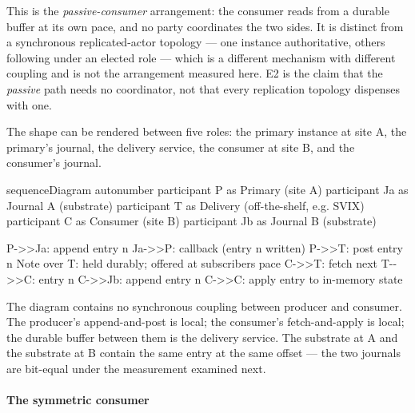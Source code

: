 \documentclass[
]{article}
\newenvironment{Shaded}{}{}
\newcommand{\NormalTok}[1]{#1}
\begin{document}
This is the \emph{passive-consumer} arrangement: the consumer reads from
a durable buffer at its own pace, and no party coordinates the two
sides. It is distinct from a synchronous replicated-actor topology ---
one instance authoritative, others following under an elected role ---
which is a different mechanism with different coupling and is not the
arrangement measured here. E2 is the claim that the \emph{passive} path
needs no coordinator, not that every replication topology dispenses with
one.

The shape can be rendered between five roles: the primary instance at
site A, the primary's journal, the delivery service, the consumer at
site B, and the consumer's journal.

\begin{Shaded}
\begin{Highlighting}[]
\NormalTok{sequenceDiagram}
\NormalTok{    autonumber}
\NormalTok{    participant P as Primary (site A)}
\NormalTok{    participant Ja as Journal A (substrate)}
\NormalTok{    participant T as Delivery (off{-}the{-}shelf, e.g. SVIX)}
\NormalTok{    participant C as Consumer (site B)}
\NormalTok{    participant Jb as Journal B (substrate)}

\NormalTok{    P{-}\textgreater{}\textgreater{}Ja: append entry n}
\NormalTok{    Ja{-}\textgreater{}\textgreater{}P: callback (entry n written)}
\NormalTok{    P{-}\textgreater{}\textgreater{}T: post entry n}
\NormalTok{    Note over T: held durably; offered at subscriber\textquotesingle{}s pace}
\NormalTok{    C{-}\textgreater{}\textgreater{}T: fetch next}
\NormalTok{    T{-}{-}\textgreater{}\textgreater{}C: entry n}
\NormalTok{    C{-}\textgreater{}\textgreater{}Jb: append entry n}
\NormalTok{    C{-}\textgreater{}\textgreater{}C: apply entry to in{-}memory state}
\end{Highlighting}
\end{Shaded}

The diagram contains no synchronous coupling between producer and
consumer. The producer's append-and-post is local; the consumer's
fetch-and-apply is local; the durable buffer between them is the
delivery service. The substrate at A and the substrate at B contain the
same entry at the same offset --- the two journals are bit-equal under
the measurement examined next.

\paragraph{The symmetric consumer}\label{the-symmetric-consumer}
\end{document}
